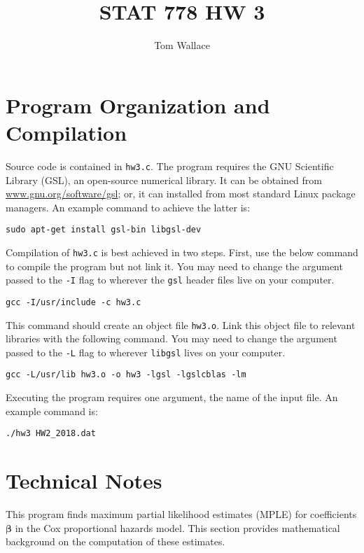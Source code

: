 \documentclass{article}
\author{Tom Wallace}
\title{STAT 778 HW 3}
\begin{document}
\maketitle

\section*{Program Organization and Compilation}

Source code is contained in \texttt{hw3.c}. 
The program requires the GNU Scientific Library (GSL), an
open-source numerical library. It can be obtained from
\url{www.gnu.org/software/gsl}; or, it can installed from most standard Linux
package managers. An example command to achieve the latter is:

\begin{center}
	\texttt{sudo apt-get install gsl-bin libgsl-dev}
\end{center}

Compilation of \texttt{hw3.c} is best achieved in two steps. First, use the below
command to compile the program but not link it. You may need to change the
argument passed to the \texttt{-I} flag to wherever the \texttt{gsl} header
files live on your computer. 

\begin{center}
	\texttt{gcc -I/usr/include -c hw3.c}
\end{center}

This command should create an object file \texttt{hw3.o}. Link this 
object file to relevant libraries with the following command.
You may need to change the argument passed to the \texttt{-L} flag to
wherever \texttt{libgsl} lives on your computer.

\begin{center}
	\texttt{gcc -L/usr/lib hw3.o -o hw3 -lgsl -lgslcblas -lm}
\end{center}

Executing the program requires one
argument, the name of the input file. An example command is:

\begin{center}
	\texttt{./hw3 HW2\_2018.dat}
\end{center}

\section*{Technical Notes}

This program finds maximum partial likelihood estimates (MPLE) for coefficients
$\bm{\beta}$ in the Cox proportional hazards model. This
section provides mathematical background on the computation of these estimates.
\end{document}
